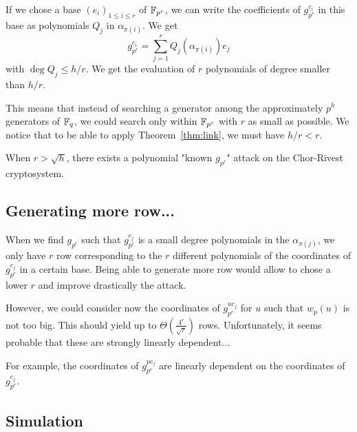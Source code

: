 \documentclass[12pt,a4paper,titlepage]{article}
\newcommand{\GF}[1]{\F_{#1}}
\begin{document}
If we chose a base $(e_i)_{1 \leq i \leq r}$ of $\GF{p^r}$, we can write the coefficients of $g_{p^r}^{c_i}$ in this base as polynomials $Q_j$ in $\alpha_{\pi(i)}$. We get
$$ g_{p^r}^{c_i} = \sum_{j=1}^r Q_j(\alpha_{\pi(i)}) e_j $$
with $\deg Q_j \leq h/r$. We get the evaluation of $r$ polynomials of degree smaller than $h/r$.

This means that instead of searching a generator among the approximately $p^h$ generators of $\mathbb{F}_q$, we could search only within $\mathbb{F}_{p^r}$ with $r$ as small as possible. We notice that to be able to apply Theorem~\ref{thm:link}, we must have $h/r < r$.

\begin{theorem}
When $r > \sqrt{h}$, there exists a polynomial "known $g_{p^r}$" attack on the Chor-Rivest cryptosystem.
\end{theorem}





\subsection{Generating more row...}
When we find $g_{p^r}$ such that $g_{p^r}^{c_j}$ is a small degree polynomials in the $\alpha_{\pi(j)}$, we only have $r$ row corresponding to the $r$ different polynomials of the coordinates of $g_{p^r}^{c_j}$ in a certain base. Being able to generate more row would allow to chose a lower $r$ and improve drastically the attack.

However, we could consider now the coordinates of $g_{p^r}^{u c_j}$ for $u$ such that $w_p(u)$ is not too big.
This should yield up to $\Theta\left(\frac{4^r}{\sqrt{r}}\right)$ rows. Unfortunately, it seems probable that these are strongly linearly dependent...

For example, the coordinates of $g_{p^r}^{p c_j}$ are linearly dependent on the coordinates of $g_{p^r}^{c_j}$.


\subsection{Simulation}
\end{document}
